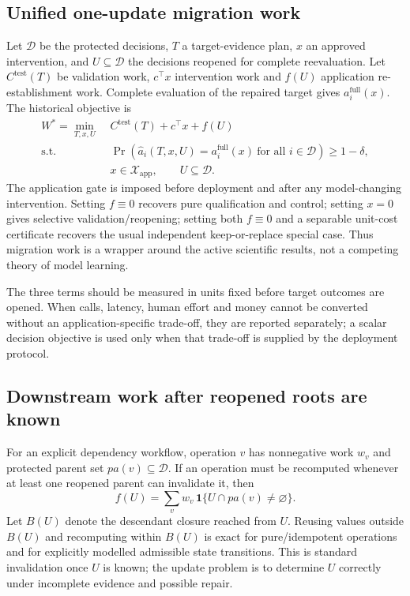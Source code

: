 \documentclass[11pt,letterpaper]{article}
\theoremstyle{plain}
\newcommand{\1}{\mathbf 1}
\begin{document}
\subsection{Unified one-update migration work}
Let $\mathcal D$ be the protected decisions, $T$ a target-evidence plan, $x$ an approved intervention, and $U\subseteq\mathcal D$ the decisions reopened for complete reevaluation. Let $C^{\mathrm{test}}(T)$ be validation work, $c^\top x$ intervention work and $f(U)$ application re-establishment work. Complete evaluation of the repaired target gives $a_i^{\mathrm{full}}(x)$. The historical objective is
\begin{equation}
\begin{aligned}
W^*=\min_{T,x,U}\;&C^{\mathrm{test}}(T)+c^\top x+f(U)\\
\text{s.t. }&\Pr\!\left(\widehat a_i(T,x,U)=a_i^{\mathrm{full}}(x)\ \text{for all }i\in\mathcal D\right)\ge 1-\delta,\\
&x\in\mathcal X_{\mathrm{app}},\qquad U\subseteq\mathcal D.
\end{aligned}
\label{eq:s_migration}
\end{equation}
The application gate is imposed before deployment and after any model-changing intervention. Setting $f\equiv0$ recovers pure qualification and control; setting $x=0$ gives selective validation/reopening; setting both $f\equiv0$ and a separable unit-cost certificate recovers the usual independent keep-or-replace special case. Thus migration work is a wrapper around the active scientific results, not a competing theory of model learning.

The three terms should be measured in units fixed before target outcomes are opened. When calls, latency, human effort and money cannot be converted without an application-specific trade-off, they are reported separately; a scalar decision objective is used only when that trade-off is supplied by the deployment protocol.

\subsection{Downstream work after reopened roots are known}
For an explicit dependency workflow, operation $v$ has nonnegative work $w_v$ and protected parent set $pa(v)\subseteq\mathcal D$. If an operation must be recomputed whenever at least one reopened parent can invalidate it, then
\begin{equation}
f(U)=\sum_v w_v\,\mathbf 1\{U\cap pa(v)\neq\varnothing\}.
\label{eq:s_coverage}
\end{equation}
Let $B(U)$ denote the descendant closure reached from $U$. Reusing values outside $B(U)$ and recomputing within $B(U)$ is exact for pure/idempotent operations and for explicitly modelled admissible state transitions. This is standard invalidation once $U$ is known; the update problem is to determine $U$ correctly under incomplete evidence and possible repair.
\end{document}
